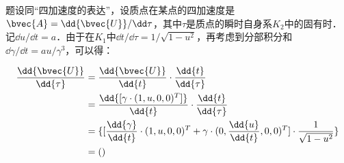 题设同“四加速度的表达”，设质点在某点的四加速度是$\bvec{A}=\dd{\bvec{U}}/\dd\tau$，其中$\tau$是质点的瞬时自身系$K_2$中的固有时．记$\dd{u}/\dd{t}=a$．由于在$K_1$中$\dd{t}/\dd{\tau}=1/\sqrt{1-u^2}$，再考虑到分部积分和$\dd{\gamma}/\dd{t}=au/\gamma^3$，可以得：

\begin{equation}
\begin{aligned}
%
\frac{\dd{\bvec{U}}}{\dd{\tau}}&=\frac{\dd{\bvec{U}}}{\dd{t}}\cdot\frac{\dd{t}}{\dd{\tau}}\\&=\frac{\dd{[\gamma\cdot(1,u,0,0)^T]}}{\dd{t}}\cdot\frac{\dd{t}}{\dd{\tau}}\\&=\{[\frac{\dd{\gamma}}{\dd{t}}\cdot(1,u,0,0)^T+\gamma\cdot(0,\frac{\dd{u}}{\dd{t}}, 0,0)^T]\cdot\frac{1}{\sqrt{1-u^2}}\}\\&=()
%
\end{aligned}
\end{equation}



